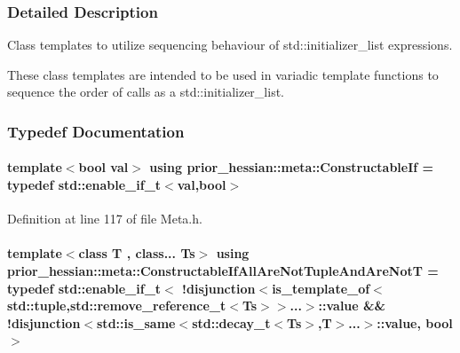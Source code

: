 \subsubsection{Detailed Description}
Class templates to utilize sequencing behaviour of std\+::initializer\+\_\+list expressions. 

These class templates are intended to be used in variadic template functions to sequence the order of calls as a std\+::initializer\+\_\+list. 

\subsubsection{Typedef Documentation}
\paragraph[{\texorpdfstring{Constructable\+If}{ConstructableIf}}]{\setlength{\rightskip}{0pt plus 5cm}template$<$bool val$>$ using {\bf prior\+\_\+hessian\+::meta\+::\+Constructable\+If} = typedef std\+::enable\+\_\+if\+\_\+t$<$val,bool$>$}\hypertarget{namespaceprior__hessian_1_1meta_aa8f9847c6c56ca1f8530657d74bb9a99}{}\label{namespaceprior__hessian_1_1meta_aa8f9847c6c56ca1f8530657d74bb9a99}


Definition at line 117 of file Meta.\+h.

\paragraph[{\texorpdfstring{Constructable\+If\+All\+Are\+Not\+Tuple\+And\+Are\+NotT}{ConstructableIfAllAreNotTupleAndAreNotT}}]{\setlength{\rightskip}{0pt plus 5cm}template$<$class T , class... Ts$>$ using {\bf prior\+\_\+hessian\+::meta\+::\+Constructable\+If\+All\+Are\+Not\+Tuple\+And\+Are\+NotT} = typedef std\+::enable\+\_\+if\+\_\+t$<$ !{\bf disjunction}$<${\bf is\+\_\+template\+\_\+of}$<$std\+::tuple,std\+::remove\+\_\+reference\+\_\+t$<$Ts$>$$>$...$>$\+::value \&\& !{\bf disjunction}$<$std\+::is\+\_\+same$<$std\+::decay\+\_\+t$<$Ts$>$,T$>$...$>$\+::value, bool$>$}\hypertarget{namespaceprior__hessian_1_1meta_a5eaabc649c9629ae8f49d45c3141c4b5}{}\label{namespaceprior__hessian_1_1meta_a5eaabc649c9629ae8f49d45c3141c4b5}


